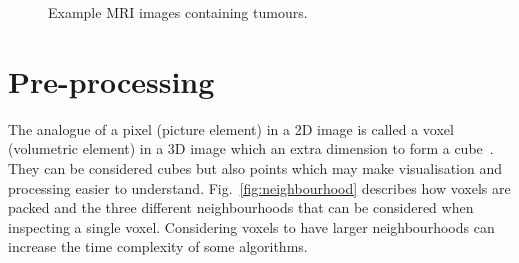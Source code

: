 \documentclass[journal]{IEEEtran}
\begin{document}
\begin{figure}[!htb]
	\centering
\caption{Example MRI images containing tumours.}
\label{fig:ex}
\end{figure}











\section{Pre-processing}
\label{sec:pre}

The analogue of a pixel (picture element) in a 2D image is called a voxel (volumetric element) in a 3D image which an extra dimension to form a cube~\cite{lohmann1998volumetric}.
They can be considered cubes but also points which may make visualisation and processing easier to understand.
Fig.~\ref{fig:neighbourhood} describes how voxels are packed and the three different neighbourhoods that can be considered when inspecting a single voxel. 
Considering voxels to have larger neighbourhoods can increase the time complexity of some algorithms.
\end{document}
